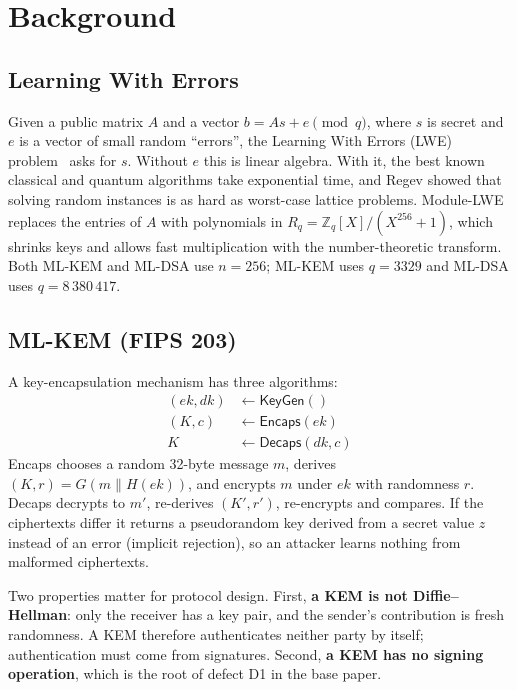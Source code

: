 \chapter{Background}
\label{ch:bg}

\section{Learning With Errors}

Given a public matrix $A$ and a vector $b = As + e \pmod q$, where $s$ is
secret and $e$ is a vector of small random ``errors'', the Learning With Errors
(LWE) problem~\cite{regev} asks for $s$. Without $e$ this is linear algebra.
With it, the best known classical and quantum algorithms take exponential
time, and Regev showed that solving random instances is as hard as
worst-case lattice problems. Module-LWE~\cite{langlois} replaces the entries
of $A$ with polynomials in $R_q = \mathbb{Z}_q[X]/(X^{256}+1)$, which shrinks
keys and allows fast multiplication with the number-theoretic transform. Both
ML-KEM and ML-DSA use $n = 256$; ML-KEM uses $q = 3329$ and ML-DSA uses
$q = 8\,380\,417$.

\section{ML-KEM (FIPS 203)}

A key-encapsulation mechanism has three algorithms:
\begin{align*}
(ek, dk) &\leftarrow \mathsf{KeyGen}() \\
(K, c) &\leftarrow \mathsf{Encaps}(ek) \\
K &\leftarrow \mathsf{Decaps}(dk, c)
\end{align*}
\textsf{Encaps} chooses a random 32-byte message $m$, derives $(K, r) =
G(m \parallel H(ek))$, and encrypts $m$ under $ek$ with randomness $r$.
\textsf{Decaps} decrypts to $m'$, re-derives $(K', r')$, re-encrypts and
compares. If the ciphertexts differ it returns a pseudorandom key derived from
a secret value $z$ instead of an error (implicit rejection), so an attacker
learns nothing from malformed ciphertexts.

Two properties matter for protocol design. First, \textbf{a KEM is not
Diffie--Hellman}: only the receiver has a key pair, and the sender's
contribution is fresh randomness. A KEM therefore authenticates neither party
by itself; authentication must come from signatures. Second, \textbf{a KEM
has no signing operation}, which is the root of defect D1 in the base paper.

